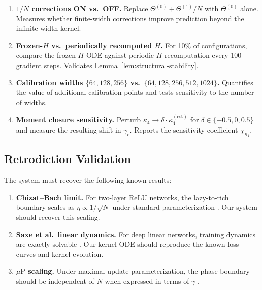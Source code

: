 \documentclass[11pt]{article}
\theoremstyle{definition}
\newcommand{\muP}{\mu\text{P}}
\renewcommand{\Theta}{\varTheta}
\begin{document}
\begin{enumerate}[leftmargin=*]
\item \textbf{$1/N$ corrections ON vs.\ OFF.} Replace $\Theta^{(0)} + \Theta^{(1)}/N$ with $\Theta^{(0)}$ alone. Measures whether finite-width corrections improve prediction beyond the infinite-width kernel.

\item \textbf{Frozen-$H$ vs.\ periodically recomputed $H$.} For 10\% of configurations, compare the frozen-$H$ ODE against periodic $H$ recomputation every 100 gradient steps. Validates Lemma~\ref{lem:structural-stability}.

\item \textbf{Calibration widths $\{64, 128, 256\}$ vs.\ $\{64, 128, 256, 512, 1024\}$.} Quantifies the value of additional calibration points and tests sensitivity to the number of widths.

\item \textbf{Moment closure sensitivity.} Perturb $\kappa_4 \to \delta \cdot \kappa_4^{(\mathrm{est})}$ for $\delta \in \{-0.5, 0, 0.5\}$ and measure the resulting shift in $\gamma_c$. Reports the sensitivity coefficient $\chi_{\kappa_4}$.
\end{enumerate}

\subsection{Retrodiction Validation}
\label{sec:retrodictions}

The system must recover the following known results:

\begin{enumerate}[leftmargin=*]
\item \textbf{Chizat--Bach limit.} For two-layer ReLU networks, the lazy-to-rich boundary scales as $\eta \propto 1/\sqrt{N}$ under standard parameterization \citep{chizat2019lazy}. Our system should recover this scaling.

\item \textbf{Saxe et al.\ linear dynamics.} For deep linear networks, training dynamics are exactly solvable \citep{saxe2014exact}. Our kernel ODE should reproduce the known loss curves and kernel evolution.

\item \textbf{$\muP$ scaling.} Under maximal update parameterization, the phase boundary should be independent of $N$ when expressed in terms of $\gamma$ \citep{yang2021tensor}.
\end{enumerate}
\end{document}
